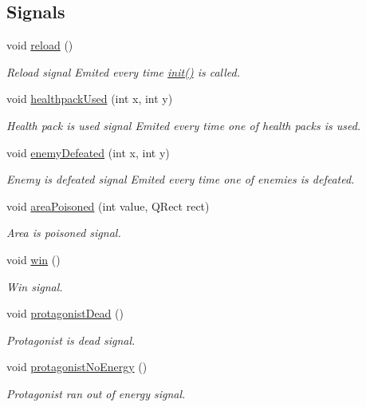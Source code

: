 \subsection*{Signals}
\begin{DoxyCompactItemize}
\item 
void \hyperlink{classWorldModel_a9ee97272fc756d45c411f578f98905af}{reload} ()\hypertarget{classWorldModel_a9ee97272fc756d45c411f578f98905af}{}\label{classWorldModel_a9ee97272fc756d45c411f578f98905af}

\begin{DoxyCompactList}\small\item\em Reload signal Emited every time \hyperlink{classWorldModel_a9003814b10d3b533d3c4313613712493}{init()} is called. \end{DoxyCompactList}\item 
void \hyperlink{classWorldModel_a1f403da0540ae3e4fe55ea7262ee2fe8}{healthpack\+Used} (int x, int y)
\begin{DoxyCompactList}\small\item\em Health pack is used signal Emited every time one of health packs is used. \end{DoxyCompactList}\item 
void \hyperlink{classWorldModel_af66c7d6051c21a0933e9ac168096dd8b}{enemy\+Defeated} (int x, int y)
\begin{DoxyCompactList}\small\item\em Enemy is defeated signal Emited every time one of enemies is defeated. \end{DoxyCompactList}\item 
void \hyperlink{classWorldModel_aceb49c5514940947dbcacc97484aa4bd}{area\+Poisoned} (int value, Q\+Rect rect)
\begin{DoxyCompactList}\small\item\em Area is poisoned signal. \end{DoxyCompactList}\item 
void \hyperlink{classWorldModel_a128eb886de920133792e1e26f1caf468}{win} ()
\begin{DoxyCompactList}\small\item\em Win signal. \end{DoxyCompactList}\item 
void \hyperlink{classWorldModel_a73bdac0d024fd7ae02f09b58e833cad3}{protagonist\+Dead} ()
\begin{DoxyCompactList}\small\item\em Protagonist is dead signal. \end{DoxyCompactList}\item 
void \hyperlink{classWorldModel_ad97bbf59d3714296882d2be9038e27bb}{protagonist\+No\+Energy} ()
\begin{DoxyCompactList}\small\item\em Protagonist ran out of energy signal. \end{DoxyCompactList}\end{DoxyCompactItemize}
